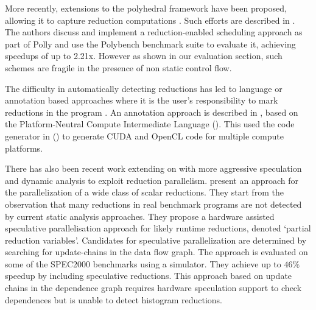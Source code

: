     More recently, extensions to the polyhedral framework have been proposed,
    allowing it to capture reduction computations
    \cite{chi1997optimizing, gupta2006simplifying, stock2014framework}.
    Such efforts are described in \cite{Doerfert2015Polly}.
    The authors discuss and implement a reduction-enabled scheduling approach as
    part of Polly and use the Polybench benchmark suite to evaluate it,
    achieving speedups of up to 2.21x.
    However as shown in our evaluation section, such schemes are fragile in the
    presence of non static control flow.

    The difficulty in automatically detecting reductions has led to language or
    annotation based approaches where it is the user's responsibility to mark
    reductions in the program \cite{deitz2002high}.
    An annotation approach is described in \cite{Reddy2016Reduction}, based on
    the Platform-Neutral Compute Intermediate Language
    (\cite{baghdadi2015PENCIL}).
    This used the code generator in
    (\cite{Verdoolaege:2013:PPC:2400682.2400713}) to generate CUDA and OpenCL
    code for multiple compute platforms.

    There has also been recent work extending on \citet{rauchwerger1999lrpd}
    with more aggressive speculation and dynamic analysis
    \citep{aguilar2015unified} to exploit reduction parallelism.
    \citet{Han2010Speculative} present an approach for the
    parallelization of a wide class of scalar reductions.
    They start from the observation that many reductions in real benchmark
    programs are not detected by current static analysis approaches.
    They propose a hardware assisted speculative parallelisation approach for
    likely runtime reductions, denoted `partial reduction variables'.
    Candidates for speculative parallelization are determined by searching for
    update-chains in the data flow graph.
    The approach is evaluated on some of the SPEC2000 benchmarks using a
    simulator.
    They achieve up to $46\%$ speedup by including speculative reductions.
    This approach
    based on update chains in the dependence graph requires hardware
    speculation support to check dependences but is unable to detect
    histogram reductions.

